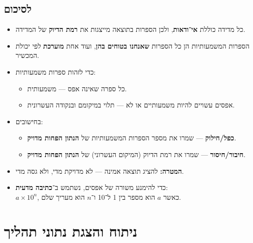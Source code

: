 \documentclass[
  hebrew,
  letterpaper,
  DIV=11,
  numbers=noendperiod]{scrreprt}
\providecommand{\tightlist}{%
  \setlength{\itemsep}{0pt}\setlength{\parskip}{0pt}}
\begin{document}
\subsection{\texorpdfstring{{לסיכום}}{לסיכום}}\label{ux5dcux5e1ux5d9ux5dbux5d5ux5dd}

\begin{itemize}
\tightlist
\item
  כל מדידה כוללת \textbf{אי־ודאות}, ולכן הספרות בתוצאה מייצגות את
  \textbf{רמת הדיוק} של המדידה.\\
\item
  הספרות המשמעותיות הן כל הספרות \textbf{שאנחנו בטוחים בהן}, ועוד אחת
  \textbf{מוערכת} לפי יכולת המכשיר.\\
\item
  כדי לזהות ספרות משמעותיות:

  \begin{itemize}
  \tightlist
  \item
    כל ספרה שאינה אפס --- משמעותית.\\
  \item
    אפסים עשויים להיות משמעותיים או לא --- תלוי במיקומם ובנקודה
    העשרונית.\\
  \end{itemize}
\item
  בחישובים:

  \begin{itemize}
  \tightlist
  \item
    \textbf{כפל/חילוק} --- שמרו את מספר הספרות המשמעותיות של
    \textbf{הנתון הפחות מדויק}.\\
  \item
    \textbf{חיבור/חיסור} --- שמרו את רמת הדיוק (המיקום העשרוני) של
    \textbf{הנתון הפחות מדויק}.\\
  \end{itemize}
\item
  \textbf{המטרה:} להציג תוצאה אמינה --- לא מדויקת מדי, ולא גסה מדי.\\
\item
  כדי להימנע משורה של אפסים, נשתמש ב־\textbf{כתיבה מדעית}:\\
  \(a \times 10^{n}\), כאשר \(a\) הוא מספר בין 1 ל־10 ו־\(n\) הוא מעריך
  שלם.
\end{itemize}

\section{\texorpdfstring{{ניתוח והצגת נתוני
תהליך}}{ניתוח והצגת נתוני תהליך}}\label{ux5e0ux5d9ux5eaux5d5ux5d7-ux5d5ux5d4ux5e6ux5d2ux5ea-ux5e0ux5eaux5d5ux5e0ux5d9-ux5eaux5d4ux5dcux5d9ux5da}
\end{document}
